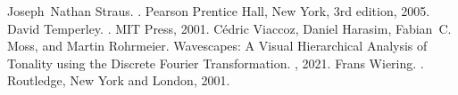 \documentclass[letterpaper,10pt,english]{sphinxmanual}
\begin{document}
\begin{sphinxthebibliography}{10}
Joseph Nathan Straus. . Pearson Prentice Hall, New York, 3rd edition, 2005.
David Temperley. . MIT Press, 2001.
Cédric Viaccoz, Daniel Harasim, Fabian C. Moss, and Martin Rohrmeier. Wavescapes: A Visual Hierarchical Analysis of Tonality using the Discrete Fourier Transformation. , 2021.
Frans Wiering. . Routledge, New York and London, 2001.
\end{sphinxthebibliography}



\renewcommand{\indexname}{Index}
\printindex
\end{document}
